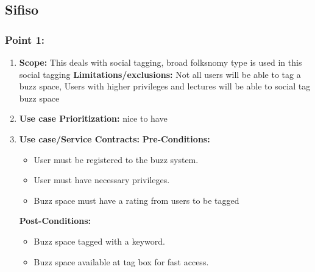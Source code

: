 \documentclass[11pt]{article}
\begin{document}
\newpage

\subsection{Sifiso}
\subsubsection{Point 1:} 
\begin{enumerate}
\item 
\textbf{Scope:}
This deals with social tagging, broad folksnomy type is used in this social tagging
\newline
\textbf{Limitations/exclusions:} 
Not all users will be able to tag a buzz space, Users with higher privileges and lectures will be able to social tag buzz space

\item 
\textbf{Use case Prioritization:} nice to have

\item 
\textbf{Use case/Service Contracts:} 
\newline
\textbf{Pre-Conditions: }
\begin{itemize}
\item User must be registered to the buzz system.
\item User must have necessary privileges.
\item Buzz space must have a rating from users to be tagged
\end{itemize}
 

\textbf{Post-Conditions: }
\begin{itemize}
\item Buzz space tagged with a keyword.
\item Buzz space available at tag box for fast access.
\end{itemize}
\end{enumerate}
\end{document}
